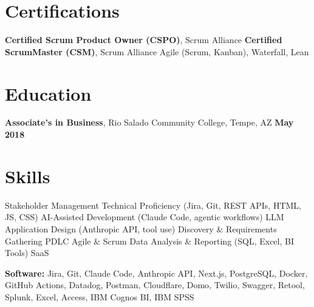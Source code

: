 \documentclass[10pt,letterpaper]{article}
\begin{document}
\section{Certifications}
\textbf{Certified Scrum Product Owner (CSPO)}, Scrum Alliance \quad\textbullet\quad \textbf{Certified ScrumMaster (CSM)}, Scrum Alliance \quad\textbullet\quad Agile (Scrum, Kanban), Waterfall, Lean

\section{Education}
\textbf{Associate's in Business}, Rio Salado Community College, Tempe, AZ \hfill \textbf{May 2018}

\section{Skills}
Stakeholder Management \textbullet{} Technical Proficiency (Jira, Git, REST APIs, HTML, JS, CSS) \textbullet{} AI-Assisted Development (Claude Code, agentic workflows) \textbullet{} LLM Application Design (Anthropic API, tool use) \textbullet{} Discovery \& Requirements Gathering \textbullet{} PDLC \textbullet{} Agile \& Scrum \textbullet{} Data Analysis \& Reporting (SQL, Excel, BI Tools) \textbullet{} SaaS

\vspace{3pt}\textbf{Software:} Jira, Git, Claude Code, Anthropic API, Next.js, PostgreSQL, Docker, GitHub Actions, Datadog, Postman, Cloudflare, Domo, Twilio, Swagger, Retool, Splunk, Excel, Access, IBM Cognos BI, IBM SPSS
\end{document}
